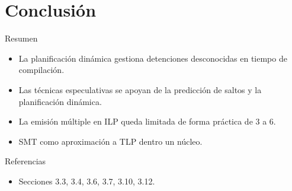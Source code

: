 \section{Conclusión}

\begin{frame}[t]{Resumen}
\begin{itemize}[<+->]
  \item La planificación dinámica gestiona detenciones desconocidas en tiempo de compilación.
  
  \item Las técnicas especulativas se apoyan de la predicción de saltos y la planificación dinámica.
  
  \item La emisión múltiple en ILP queda limitada de forma práctica de 3 a 6.
  
  \item SMT como aproximación a TLP dentro un núcleo.
\end{itemize}
\end{frame}


\begin{frame}[t]{Referencias}
\begin{itemize}
  \item \bibhennessy
  Secciones 3.3, 3.4, 3.6, 3.7, 3.10, 3.12.

\end{itemize}
\end{frame}
